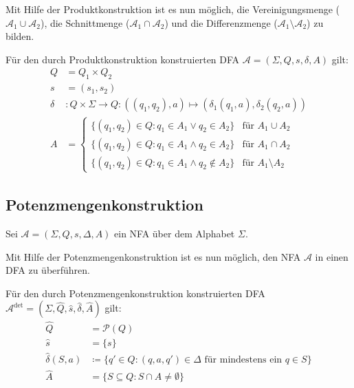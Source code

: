 \documentclass[a4paper, 11pt, accentcolor = tud3b]{tudreport}
\begin{document}
            Mit Hilfe der Produktkonstruktion ist es nun möglich, die Vereinigungsmenge ($ \mathcal{A} _ 1 \cup \mathcal{A} _ 2 $), die Schnittmenge ($ \mathcal{A} _ 1 \cap \mathcal{A} _ 2 $) und die Differenzmenge ($ \mathcal{A} _ 1 \setminus \mathcal{A} _ 2 $) zu bilden.

            Für den durch Produktkonstruktion konstruierten DFA $ \mathcal{A} = (\Sigma, Q, s, \delta, A) $ gilt:
            \begin{equation*}
                \begin{split}
                    Q      & = Q _ 1 \times Q _ 2
                    \\
                    s      & = (s _ 1, s _ 2)
                    \\
                    \delta & : Q \times \Sigma \rightarrow Q : ((q _ 1, q _ 2), a) \mapsto (\delta _ 1 (q _ 1, a), \delta _ 2 (q _ 2, a))
                    \\
                    A      & =
                        \begin{cases}
                            \{ (q _ 1, q _ 2) \in Q : q _ 1 \in A _ 1 \lor q _ 2 \in A _ 2 \}       & \text{für } A _ 1 \cup A _ 2      \\
                            \{ (q _ 1, q _ 2) \in Q : q _ 1 \in A _ 1 \land q _ 2 \in A _ 2 \}      & \text{für } A _ 1 \cap A _ 2      \\
                            \{ (q _ 1, q _ 2) \in Q : q _ 1 \in A _ 1 \land q _ 2 \notin A _ 2 \}   & \text{für } A _ 1 \setminus A _ 2
                        \end{cases}
                \end{split}
            \end{equation*}


        \subsection{Potenzmengenkonstruktion}
            Sei $ \mathcal{A} = (\Sigma, Q, s, \Delta, A) $ ein NFA über dem Alphabet $ \Sigma $.

            Mit Hilfe der Potenzmengenkonstruktion ist es nun möglich, den NFA $ \mathcal{A} $ in einen DFA zu überführen.

            Für den durch Potenzmengenkonstruktion konstruierten DFA $ \mathcal{A} ^ \text{det} = (\Sigma, \hat{Q}, \hat{s}, \hat{\delta}, \hat{A}) $ gilt:
            \begin{equation*}
                \begin{split}
                    \hat{Q}      & = \mathcal{P}(Q)
                    \\
                    \hat{s}      & = \{ s \}
                    \\
                    \hat{\delta}(S, a) & \coloneqq \{ q' \in Q : (q, a, q') \in \Delta \text{ für mindestens ein } q \in S \}
                    \\
                    \hat{A}      & = \{ S \subseteq Q : S \cap A \neq \emptyset \}
                \end{split}
            \end{equation*}
\end{document}
